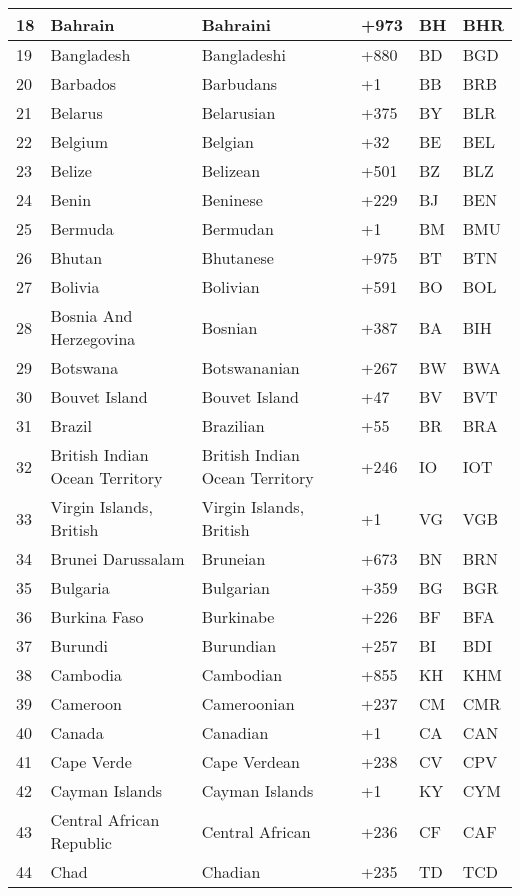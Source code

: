 \begin{longtable}{|l|l|l|l|l|l|}
18 & Bahrain & Bahraini & +973 & BH & BHR \\ \hline 
19 & Bangladesh & Bangladeshi & +880 & BD & BGD \\ \hline 
20 & Barbados & Barbudans & +1 & BB & BRB \\ \hline 
21 & Belarus & Belarusian & +375 & BY & BLR \\ \hline 
22 & Belgium & Belgian & +32 & BE & BEL \\ \hline 
23 & Belize & Belizean & +501 & BZ & BLZ \\ \hline 
24 & Benin & Beninese & +229 & BJ & BEN \\ \hline 
25 & Bermuda & Bermudan & +1 & BM & BMU \\ \hline 
26 & Bhutan & Bhutanese & +975 & BT & BTN \\ \hline 
27 & Bolivia & Bolivian & +591 & BO & BOL \\ \hline 
28 & Bosnia And Herzegovina & Bosnian & +387 & BA & BIH \\ \hline 
29 & Botswana & Botswananian & +267 & BW & BWA \\ \hline 
30 & Bouvet Island & Bouvet Island & +47 & BV & BVT \\ \hline 
31 & Brazil & Brazilian & +55 & BR & BRA \\ \hline 
32 & British Indian Ocean Territory & British Indian Ocean Territory & +246 & IO & IOT \\ \hline 
33 & Virgin Islands, British & Virgin Islands, British & +1 & VG & VGB \\ \hline 
34 & Brunei Darussalam & Bruneian & +673 & BN & BRN \\ \hline 
35 & Bulgaria & Bulgarian & +359 & BG & BGR \\ \hline 
36 & Burkina Faso & Burkinabe & +226 & BF & BFA \\ \hline 
37 & Burundi & Burundian & +257 & BI & BDI \\ \hline 
38 & Cambodia & Cambodian & +855 & KH & KHM \\ \hline 
39 & Cameroon & Cameroonian & +237 & CM & CMR \\ \hline 
40 & Canada & Canadian & +1 & CA & CAN \\ \hline 
41 & Cape Verde & Cape Verdean & +238 & CV & CPV \\ \hline 
42 & Cayman Islands & Cayman Islands & +1 & KY & CYM \\ \hline 
43 & Central African Republic & Central African & +236 & CF & CAF \\ \hline 
44 & Chad & Chadian & +235 & TD & TCD \\ \hline 

\end{longtable}
